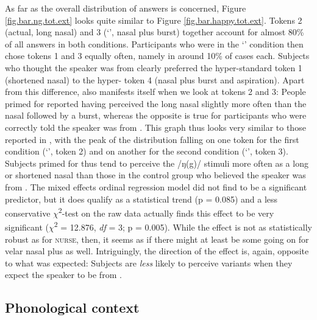 As far as the overall distribution of answers is concerned, Figure \ref{fig.bar.ng.tot.ext} looks quite similar to Figure \ref{fig.bar.happy.tot.ext}.
Tokens 2 (actual, long nasal) and 3 (`', nasal plus burst) together account for almost 80\% of all answers in both conditions.
Participants who were in the `' condition then chose tokens 1 and 3 equally often, namely in around 10\% of cases each.
Subjects who thought the speaker was from  clearly preferred the hyper-standard token 1 (shortened nasal) to the hyper- token 4 (nasal plus burst and aspiration).
Apart from this difference,  also manifests itself when we look at tokens 2 and 3: People primed for  reported having perceived the long nasal slightly more often than the nasal followed by a burst, whereas the opposite is true for participants who were correctly told the speaker was from .
This graph thus looks very similar to those reported in \textcite{hayetal2006a, haydrager2010}, with the peak of the distribution falling on one token for the first condition (`', token 2) and on another for the second condition (`', token 3).
Subjects primed for  thus tend to perceive the /ŋ(g)/ stimuli more often as a long or shortened nasal than those in the control group who believed the speaker was from .
The mixed effects ordinal regression model did not find  to be a significant predictor, but it does qualify as a statistical trend (p = 0.085) and a less conservative \(\chi\)\textsuperscript{2}-test on the raw data actually finds this effect to be very significant (\(\chi\)\textsuperscript{2} = 12.876, \emph{df} = 3; p = 0.005).
While the effect is not as statistically robust as for \textsc{nurse}, then, it seems as if there might at least be some  going on for velar nasal plus as well.
Intriguingly, the direction of the effect is, again, opposite to what was expected: Subjects are \emph{less} likely to perceive  variants when they expect the speaker to be from .

\subsection{Phonological context}
\label{sec.perc_res.ng.phon}

